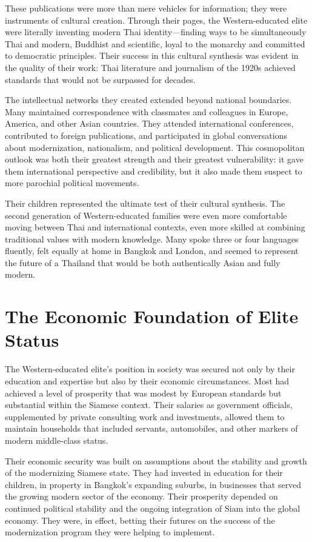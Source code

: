 \documentclass[
  Letterpaper,
]{scrbook}
\begin{document}
These publications were more than mere vehicles for information; they
were instruments of cultural creation. Through their pages, the
Western-educated elite were literally inventing modern Thai
identity---finding ways to be simultaneously Thai and modern, Buddhist
and scientific, loyal to the monarchy and committed to democratic
principles. Their success in this cultural synthesis was evident in the
quality of their work: Thai literature and journalism of the 1920s
achieved standards that would not be surpassed for decades.

The intellectual networks they created extended beyond national
boundaries. Many maintained correspondence with classmates and
colleagues in Europe, America, and other Asian countries. They attended
international conferences, contributed to foreign publications, and
participated in global conversations about modernization, nationalism,
and political development. This cosmopolitan outlook was both their
greatest strength and their greatest vulnerability: it gave them
international perspective and credibility, but it also made them suspect
to more parochial political movements.

Their children represented the ultimate test of their cultural
synthesis. The second generation of Western-educated families were even
more comfortable moving between Thai and international contexts, even
more skilled at combining traditional values with modern knowledge. Many
spoke three or four languages fluently, felt equally at home in Bangkok
and London, and seemed to represent the future of a Thailand that would
be both authentically Asian and fully modern.

\section{The Economic Foundation of Elite
Status}\label{the-economic-foundation-of-elite-status}

The Western-educated elite's position in society was secured not only by
their education and expertise but also by their economic circumstances.
Most had achieved a level of prosperity that was modest by European
standards but substantial within the Siamese context. Their salaries as
government officials, supplemented by private consulting work and
investments, allowed them to maintain households that included servants,
automobiles, and other markers of modern middle-class status.

Their economic security was built on assumptions about the stability and
growth of the modernizing Siamese state. They had invested in education
for their children, in property in Bangkok's expanding suburbs, in
businesses that served the growing modern sector of the economy. Their
prosperity depended on continued political stability and the ongoing
integration of Siam into the global economy. They were, in effect,
betting their futures on the success of the modernization program they
were helping to implement.
\end{document}
